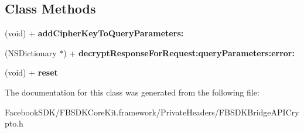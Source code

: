 \subsection*{Class Methods}
\begin{DoxyCompactItemize}
\item 
\hypertarget{interface_f_b_s_d_k_bridge_a_p_i_crypto_a2c20a55dfc9425193378405ec175c545}{(void) + {\bfseries add\-Cipher\-Key\-To\-Query\-Parameters\-:}}\label{interface_f_b_s_d_k_bridge_a_p_i_crypto_a2c20a55dfc9425193378405ec175c545}

\item 
\hypertarget{interface_f_b_s_d_k_bridge_a_p_i_crypto_af1cca4a45d2bfa6f3c04939f0ed009a3}{(N\-S\-Dictionary $\ast$) + {\bfseries decrypt\-Response\-For\-Request\-:query\-Parameters\-:error\-:}}\label{interface_f_b_s_d_k_bridge_a_p_i_crypto_af1cca4a45d2bfa6f3c04939f0ed009a3}

\item 
\hypertarget{interface_f_b_s_d_k_bridge_a_p_i_crypto_a5530ad3ae4656b272195b36979b1e1e0}{(void) + {\bfseries reset}}\label{interface_f_b_s_d_k_bridge_a_p_i_crypto_a5530ad3ae4656b272195b36979b1e1e0}

\end{DoxyCompactItemize}


The documentation for this class was generated from the following file\-:\begin{DoxyCompactItemize}
\item 
Facebook\-S\-D\-K/\-F\-B\-S\-D\-K\-Core\-Kit.\-framework/\-Private\-Headers/F\-B\-S\-D\-K\-Bridge\-A\-P\-I\-Crypto.\-h\end{DoxyCompactItemize}
